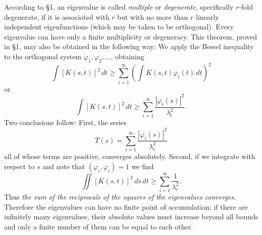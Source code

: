 According to \S1, an eigenvalue is called \emph{multiple} or \emph{degenerate}, specifically $r$-fold degenerate, if it is associated with $r$ but with no more than $r$ linearly independent eigenfunctions (which may be taken to be orthogonal). Every eigenvalue can have only a finite multiplicity or degeneracy. This theorem, proved in \S1, may also be obtained in the following way: We apply the Bessel inequality to the orthogonal system $\varphi_1,\varphi_2,\ldots$, obtaining
\begin{equation}\tag{46}
\int [K(s,t)]^2\,dt\ge\sum_{i=1}^{\infty}\left(\int K(s,t)\varphi_i(t)\,dt\right)^2
\end{equation}
or
\begin{equation}\tag{47}
\int [K(s,t)]^2\,dt\ge\sum_{i=1}^{\infty}\frac{|\varphi_i(s)|^2}{\lambda_i^2}.
\end{equation}
Two conclusions follow: First, the series
\begin{equation}\tag{48}
T(s)=\sum_{i=1}^{\infty}\frac{|\varphi_i(s)|^2}{\lambda_i^2}
\end{equation}
all of whose terms are positive, converges absolutely. Second, if we integrate with respect to $s$ and note that $(\varphi_i,\varphi_i)=1$ we find
\begin{equation}\tag{49}
\iint [K(s,t)]^2\,ds\,dt\ge\sum_{i=1}^{\infty}\frac{1}{\lambda_i^2}.
\end{equation}
Thus \emph{the sum of the reciprocals of the squares of the eigenvalues converges.} Therefore the eigenvalues can have no finite point of accumulation; if there are infinitely many eigenvalues, their absolute values must increase beyond all bounds and only a finite number of them can be equal to each other.

